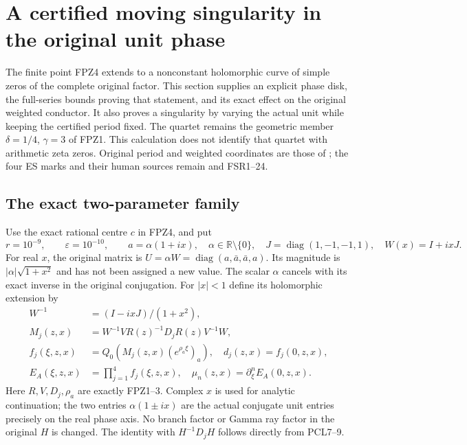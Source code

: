 \section{A certified moving singularity in the original unit phase}
\label{sec:unit-phase-persistence}
The finite point FPZ4 extends to a nonconstant holomorphic curve of
simple zeros of the complete original factor. This section supplies an
explicit phase disk, the full-series bounds proving that statement,
and its exact effect on the original weighted conductor. It also
proves a singularity by varying the actual unit while keeping the
certified period fixed. The quartet remains the geometric member
$\delta=1/4$, $\gamma=3$ of FPZ1. This calculation does not identify
that quartet with arithmetic zeta zeros. Original period and weighted
coordinates are those of \cite{PCLOriginal,WCF}; the four ES marks
and their human sources remain \cite{ES488} and FSR1--24.

\subsection{The exact two-parameter family}
Use the exact rational centre $c$ in FPZ4, and put
\[
 r=10^{-9},\qquad \varepsilon=10^{-10},\qquad
 a=\alpha(1+ix),\quad \alpha\in\mathbb R\setminus\{0\},
 \quad J=\operatorname{diag}(1,-1,-1,1),\quad W(x)=I+ixJ.
 \tag{UPP1}
\]
For real $x$, the original matrix is
$U=\alpha W=\operatorname{diag}(a,\bar a,\bar a,a)$.
Its magnitude is $|\alpha|\sqrt{1+x^2}$ and has not been assigned
a new value. The scalar $\alpha$ cancels with its exact inverse in
the original conjugation. For $|x|<1$ define its holomorphic extension by
\[
 \begin{aligned}
 W^{-1}&=(I-ixJ)/(1+x^2),\\
 M_j(z,x)&=W^{-1}V R(z)^{-1}D_jR(z)V^{-1}W,\\
 f_j(\xi,z,x)&=Q_0(M_j(z,x)(e^{\rho_a\xi})_a),\quad
 d_j(z,x)=f_j(0,z,x),\\
 E_A(\xi,z,x)&=\prod_{j=1}^4 f_j(\xi,z,x),\quad
 \mu_n(z,x)=\partial_\xi^n E_A(0,z,x).
 \end{aligned}\tag{UPP2}
\]
Here $R,V,D_j,\rho_a$ are exactly FPZ1--3. Complex $x$ is used
for analytic continuation; the two entries $\alpha(1\pm ix)$ are
the actual conjugate unit entries precisely on the real phase axis.
No branch factor or Gamma ray factor in the original $H$ is changed.
The identity with $H^{-1}D_jH$ follows directly from PCL7--9.

